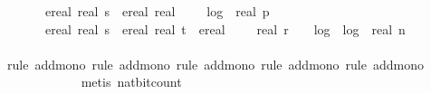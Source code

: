 \begin{isabellebody}
\ \ \ \ \ \ {\isacharplus}{\kern0pt}\ {\isacharparenleft}{\kern0pt}ereal\ {\isacharparenleft}{\kern0pt}real\ s{\isacharparenright}{\kern0pt}\ {\isacharasterisk}{\kern0pt}\ {\isacharparenleft}{\kern0pt}ereal\ {\isacharparenleft}{\kern0pt}real\ {}\ {\isacharasterisk}{\kern0pt}\ {\isacharparenleft}{\kern0pt}{}\ {\isacharasterisk}{\kern0pt}\ log\ {}\ {\isacharparenleft}{\kern0pt}real\ p{\isacharparenright}{\kern0pt}\ {\isacharplus}{\kern0pt}\ {}{\isacharparenright}{\kern0pt}\ {\isacharplus}{\kern0pt}\ {}{\isacharparenright}{\kern0pt}\ {\isacharplus}{\kern0pt}\ {}{\isacharparenright}{\kern0pt}\ {\isacharplus}{\kern0pt}\ {}{\isacharparenright}{\kern0pt}\ \isanewline
\ \ \ \ \ \ {\isacharplus}{\kern0pt}\ {\isacharparenleft}{\kern0pt}ereal\ {\isacharparenleft}{\kern0pt}real\ s{\isacharparenright}{\kern0pt}\ {\isacharasterisk}{\kern0pt}\ {\isacharparenleft}{\kern0pt}{\isacharparenleft}{\kern0pt}ereal\ {\isacharparenleft}{\kern0pt}real\ t{\isacharparenright}{\kern0pt}\ {\isacharasterisk}{\kern0pt}\ {\isacharparenleft}{\kern0pt}ereal\ {\isacharparenleft}{\kern0pt}{}{}\ {\isacharplus}{\kern0pt}\ {}\ {\isacharasterisk}{\kern0pt}\ real\ r\ {\isacharplus}{\kern0pt}\ {}\ {\isacharasterisk}{\kern0pt}\ log\ {}\ {\isacharparenleft}{\kern0pt}log\ {}\ {\isacharparenleft}{\kern0pt}real\ {\isacharparenleft}{\kern0pt}n\ {\isacharplus}{\kern0pt}\ {}{\isacharparenright}{\kern0pt}{\isacharparenright}{\kern0pt}{\isacharparenright}{\kern0pt}{\isacharparenright}{\kern0pt}\isanewline
\ \ \ \ \ \ \ \ \ \ \ {\isacharplus}{\kern0pt}\ {}{\isacharparenright}{\kern0pt}\ {\isacharplus}{\kern0pt}\ {}{\isacharparenright}{\kern0pt}\ {\isacharplus}{\kern0pt}\ {}{\isacharparenright}{\kern0pt}\ {\isacharplus}{\kern0pt}\ {}{\isacharparenright}{\kern0pt}{\isachardoublequoteclose}\isanewline
\ \ \ \ \ \ \isamarkupfalse%
\ {\isacharparenleft}{\kern0pt}rule\ add{\isacharunderscore}{\kern0pt}mono{\isacharcomma}{\kern0pt}\ rule\ add{\isacharunderscore}{\kern0pt}mono{\isacharcomma}{\kern0pt}\ rule\ add{\isacharunderscore}{\kern0pt}mono{\isacharcomma}{\kern0pt}\ rule\ add{\isacharunderscore}{\kern0pt}mono{\isacharcomma}{\kern0pt}\ rule\ add{\isacharunderscore}{\kern0pt}mono{\isacharparenright}{\kern0pt}\isanewline
\ \ \ \ \ \ \ \ \ \ \ \isamarkupfalse%
\ {\isacharparenleft}{\kern0pt}metis\ nat{\isacharunderscore}{\kern0pt}bit{\isacharunderscore}{\kern0pt}count{\isacharparenright}{\kern0pt}\isanewline

\end{isabellebody}
